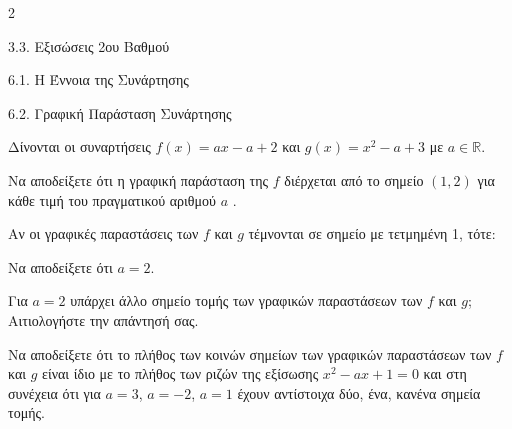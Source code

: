 \begin{ylh}{2}
    \item 3.3. Εξισώσεις 2ου Βαθμού
    \item 6.1. Η Έννοια της Συνάρτησης
    \item 6.2. Γραφική Παράσταση Συνάρτησης
\end{ylh}
Δίνονται οι συναρτήσεις $f(x) = a x - a + 2$ και $g(x) = x^2 - a + 3$ με $a \in \mathbb{R}$.

\begin{alist}
\item Να αποδείξετε ότι η γραφική παράσταση της $f$ διέρχεται από το σημείο $(1, 2)$ για κάθε τιμή του πραγματικού αριθμού $a$ .
\item Αν οι γραφικές παραστάσεις των $f$ και $g$ τέμνονται σε σημείο με τετμημένη 1, τότε:
\begin{rlist}
\item Να αποδείξετε ότι $a = 2$.
\item Για $a = 2$ υπάρχει άλλο σημείο τομής των γραφικών παραστάσεων των $f$ και $g$; Αιτιολογήστε την απάντησή σας.

\end{rlist}
\item Να αποδείξετε ότι το πλήθος των κοινών σημείων των γραφικών παραστάσεων των $f$ και $g$ είναι ίδιο με το πλήθος των ριζών της εξίσωσης $x^2 - a x + 1 = 0$ και στη συνέχεια ότι για $a = 3$, $a = -2$, $a = 1$ έχουν αντίστοιχα δύο, ένα, κανένα σημεία τομής.
\end{alist}

